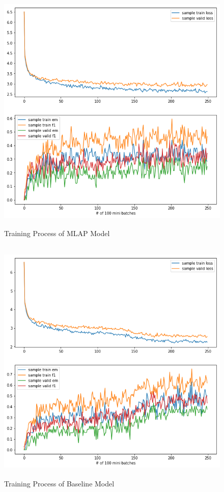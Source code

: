 \documentclass[modernstyle,12pt]{sjsuthesis}
\theoremstyle{definition}
\begin{document}
\begin{figure}[htbp]\centering
  \includegraphics[width=12cm, height=12cm]{figures/match_corrected.png}
  \caption{Training Process of MLAP Model}
  \label{f:mlap}
\end{figure}

\begin{figure}[htbp]\centering
  \includegraphics[width=12cm, height=12cm]{figures/match_baseline.png}
  \caption{Training Process of Baseline Model}
  \label{f:baseline}
\end{figure}
\end{document}
